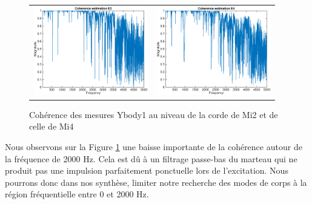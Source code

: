 \begin{figure}[h]
\centering
\begin{tabular}{cc}
   \includegraphics[width = 5cm]{figures/coherence_Z_1_E2.eps} &
   \includegraphics[width = 5cm]{figures/coherence_Z_1_E4.eps} \\
\end{tabular}
\caption{Cohérence des mesures Ybody1 au niveau de la corde de Mi2 et de celle de Mi4}
\label{fig:gall}
\end{figure}

Nous observons sur la Figure \ref{fig:gall} une baisse importante de la
cohérence autour de la fréquence de 2000 Hz. Cela est dû à un filtrage
passe-bas du marteau qui ne produit pas une impulsion parfaitement ponctuelle
lors de l'excitation. Nous pourrons donc dans nos synthèse, limiter notre
recherche des modes de corps à la région fréquentielle entre 0 et 2000 Hz.
